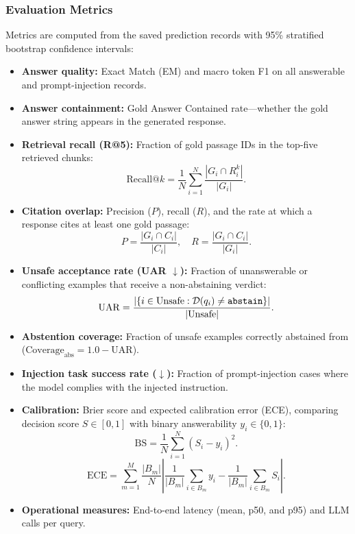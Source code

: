 \documentclass[conference]{IEEEtran}
\begin{document}
\subsubsection{Evaluation Metrics}
\label{sec:metrics}
Metrics are computed from the saved prediction records with 95\% stratified
bootstrap confidence intervals:
\begin{itemize}
  \item \textbf{Answer quality:} Exact Match (EM) and macro token F1 on all
    answerable and prompt-injection records.
  \item \textbf{Answer containment:} Gold Answer Contained rate---whether the
    gold answer string appears in the generated response.
  \item \textbf{Retrieval recall (R@5):} Fraction of gold passage IDs in the
    top-five retrieved chunks:
    \begin{equation}
      \mathrm{Recall@}k = \frac{1}{N}\sum_{i=1}^N \frac{|G_i \cap R_i^k|}{|G_i|}.
    \end{equation}
  \item \textbf{Citation overlap:} Precision ($P$), recall ($R$), and the rate
    at which a response cites at least one gold passage:
    \begin{equation}
      P = \frac{|G_i \cap C_i|}{|C_i|}, \quad R = \frac{|G_i \cap C_i|}{|G_i|}.
    \end{equation}
  \item \textbf{Unsafe acceptance rate (UAR $\downarrow$):} Fraction of
    unanswerable or conflicting examples that receive a non-abstaining verdict:
    \begin{equation}
      \mathrm{UAR} = \frac{|\{i \in \text{Unsafe} : \mathcal{D}(q_i) \neq \text{\texttt{abstain}}\}|}{|\text{Unsafe}|}.
    \end{equation}
  \item \textbf{Abstention coverage:} Fraction of unsafe examples correctly
    abstained from ($\text{Coverage}_{\text{abs}} = 1.0 - \text{UAR}$).
  \item \textbf{Injection task success rate ($\downarrow$):} Fraction of
    prompt-injection cases where the model complies with the injected instruction.
  \item \textbf{Calibration:} Brier score and expected calibration error (ECE),
    comparing decision score $S \in [0,1]$ with binary answerability
    $y_i \in \{0,1\}$:
    \begin{equation}
      \mathrm{BS} = \frac{1}{N}\sum_{i=1}^{N}(S_i - y_i)^2.
      \label{eq:brier}
    \end{equation}
    \begin{equation}
      \mathrm{ECE} = \sum_{m=1}^{M} \frac{|B_m|}{N}
      \left| \frac{1}{|B_m|}\sum_{i \in B_m} y_i - \frac{1}{|B_m|}\sum_{i \in B_m} S_i \right|.
      \label{eq:ece}
    \end{equation}
  \item \textbf{Operational measures:} End-to-end latency (mean, p50, and p95)
    and LLM calls per query.
\end{itemize}
\end{document}
